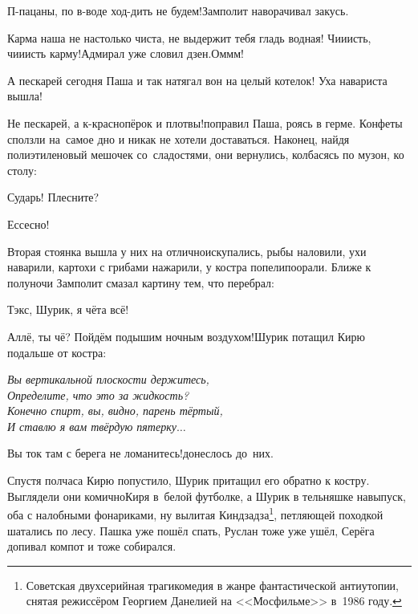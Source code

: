 \diagdash П-пацаны, по в-воде ход-дить не будем!\mdash Замполит наворачивал закусь.

\diagdash Карма наша не настолько чиста, не выдержит тебя гладь водная! Чи\sdash и\sdash исть, чи\sdash и\sdash исть карму!\mdash Адмирал уже словил дзен.\mdash Ом\sdash м\sdash м!

\diagdash А пескарей сегодня Паша и так натягал вон на целый котелок! Уха навариста вышла!

\diagdash Не пескарей, а к-краснопёрок и плотвы!\mdash поправил Паша, роясь в герме. Конфеты сползли на~самое дно и никак не хотели доставаться. Наконец, найдя полиэтиленовый мешочек со~сладостями, они вернулись, колбасясь по музон, ко столу:

\diagdash Сударь! Плесните?

\diagdash Ессесно!

Вторая стоянка вышла у них на отлично\mdash искупались, рыбы наловили, ухи наварили, картохи с грибами нажарили, у костра попели\sdash поорали. Ближе к полуночи Замполит смазал картину тем, что перебрал:

\diagdash Тэк\sdash с, Шурик, я чёта всё!

\diagdash Аллё, ты чё? Пойдём подышим ночным воздухом!\mdash Шурик потащил Кирю подальше от костра:

\noindent\textit{%
	\hspace*{2.0cm}Вы вертикальной плоскости держитесь,\\	
	\hspace*{2.0cm}Определите, что это за жидкость?\\	
	\hspace*{2.0cm}Конечно спирт, вы, видно, парень тёртый,\\	
	\hspace*{2.0cm}И ставлю я вам твёрдую пятерку$\ldots$	
}

\diagdash Вы ток там с берега не ломанитесь!\mdash донеслось до~них.

\renewcommand*{\thefootnote}{\fnsymbol{footnote}}
\setcounter{footnote}{0}
Спустя полчаса Кирю попустило, Шурик притащил его обратно к костру. Выглядели они комично\mdash Киря в~белой футболке, а Шурик в тельняшке навыпуск, оба с налобными фонариками, ну вылитая Кин\sdash дза\sdash дза\footnote{Советская двухсерийная трагикомедия в жанре фантастической антиутопии, снятая режиссёром Георгием Данелией на <<Мосфильме>> в~1986 году.}, петляющей походкой шатались по лесу. Пашка уже пошёл спать, Руслан тоже уже ушёл, Серёга допивал компот и тоже собирался.

